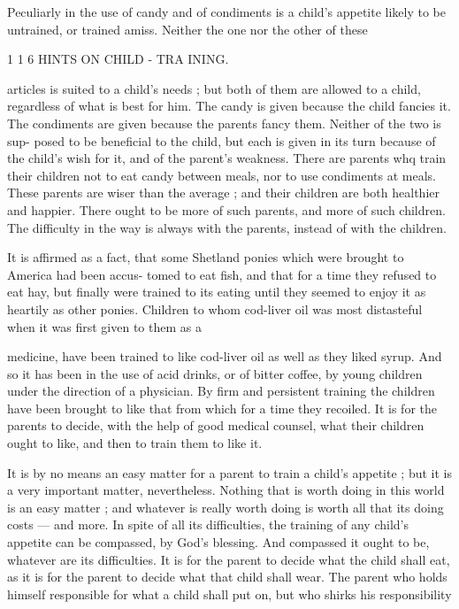 \documentclass[
]{book}
\begin{document}
Peculiarly in the use of candy and of condiments is a child's appetite likely to be untrained, or trained amiss. Neither the one nor the other of these

1 1 6 HINTS ON CHILD - TRA INING.

articles is suited to a child's needs ; but both of them are allowed to a child, regardless of what is best for him. The candy is given because the child fancies it. The condiments are given because the parents fancy them. Neither of the two is sup- posed to be beneficial to the child, but each is given in its turn because of the child's wish for it, and of the parent's weakness. There are parents whq train their children not to eat candy between meals, nor to use condiments at meals. These parents are wiser than the average ; and their children are both healthier and happier. There ought to be more of such parents, and more of such children. The difficulty in the way is always with the parents, instead of with the children.

It is affirmed as a fact, that some Shetland ponies which were brought to America had been accus- tomed to eat fish, and that for a time they refused to eat hay, but finally were trained to its eating until they seemed to enjoy it as heartily as other ponies. Children to whom cod-liver oil was most distasteful when it was first given to them as a

medicine, have been trained to like cod-liver oil as well as they liked syrup. And so it has been in the use of acid drinks, or of bitter coffee, by young children under the direction of a physician. By firm and persistent training the children have been brought to like that from which for a time they recoiled. It is for the parents to decide, with the help of good medical counsel, what their children ought to like, and then to train them to like it.

It is by no means an easy matter for a parent to train a child's appetite ; but it is a very important matter, nevertheless. Nothing that is worth doing in this world is an easy matter ; and whatever is really worth doing is worth all that its doing costs --- and more. In spite of all its difficulties, the training of any child's appetite can be compassed, by God's blessing. And compassed it ought to be, whatever are its difficulties. It is for the parent to decide what the child shall eat, as it is for the parent to decide what that child shall wear. The parent who holds himself responsible for what a child shall put on, but who shirks his responsibility
\end{document}
